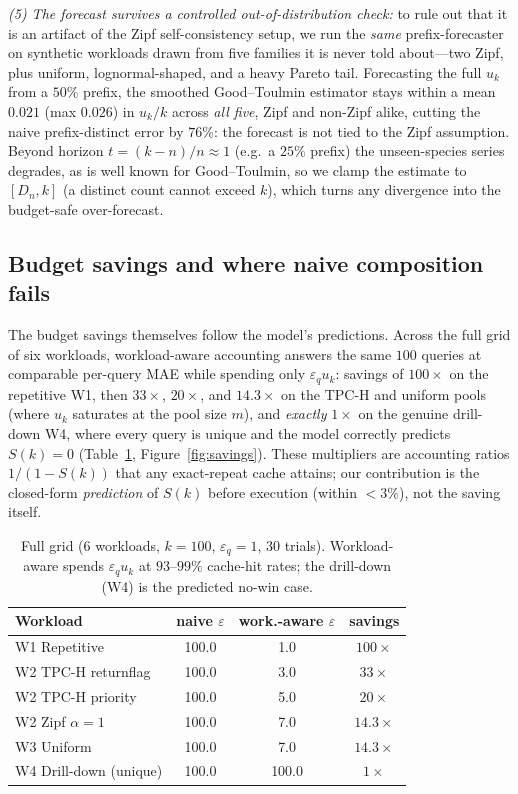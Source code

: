 \documentclass[sigconf,nonacm]{acmart}
\newcommand{\eps}{\varepsilon}
\begin{document}
\emph{(5) The forecast survives a controlled out-of-distribution check:} to rule out that it is an artifact of the Zipf self-consistency setup, we run the \emph{same} prefix-forecaster on synthetic workloads drawn from five families it is never told about---two Zipf, plus uniform, lognormal-shaped, and a heavy Pareto tail. Forecasting the full $u_k$ from a $50\%$ prefix, the smoothed Good--Toulmin estimator stays within a mean $0.021$ (max $0.026$) in $u_k/k$ across \emph{all five}, Zipf and non-Zipf alike, cutting the naive prefix-distinct error by $76\%$: the forecast is not tied to the Zipf assumption. Beyond horizon $t{=}(k{-}n)/n\approx1$ (e.g.\ a $25\%$ prefix) the unseen-species series degrades, as is well known for Good--Toulmin, so we clamp the estimate to $[D_n,k]$ (a distinct count cannot exceed $k$), which turns any divergence into the budget-safe over-forecast.

\subsection{Budget savings and where naive composition fails}

The budget savings themselves follow the model's predictions. Across the full grid of six workloads, workload-aware accounting answers the same $100$ queries at comparable per-query MAE while spending only $\eps_q u_k$: savings of $100\times$ on the repetitive W1, then $33\times$, $20\times$, and $14.3\times$ on the TPC-H and uniform pools (where $u_k$ saturates at the pool size $m$), and \emph{exactly} $1\times$ on the genuine drill-down W4, where every query is unique and the model correctly predicts $S(k){=}0$ (Table~\ref{tab:fullgrid}, Figure~\ref{fig:savings}). These multipliers are accounting ratios $1/(1-S(k))$ that any exact-repeat cache attains; our contribution is the closed-form \emph{prediction} of $S(k)$ before execution (within $<3\%$), not the saving itself.

\begin{table}[h]
\footnotesize\centering
\caption{Full grid (6 workloads, $k{=}100$, $\eps_q{=}1$, 30 trials). Workload-aware spends $\eps_q u_k$ at $93$--$99\%$ cache-hit rates; the drill-down (W4) is the predicted no-win case.}
\label{tab:fullgrid}
\begin{tabular}{l|cc|c}
\toprule
Workload & naive $\eps$ & work.-aware $\eps$ & savings \\
\midrule
W1 Repetitive & 100.0 & 1.0 & $100\times$ \\
W2 TPC-H returnflag & 100.0 & 3.0 & $33\times$ \\
W2 TPC-H priority & 100.0 & 5.0 & $20\times$ \\
W2 Zipf $\alpha{=}1$ & 100.0 & 7.0 & $14.3\times$ \\
W3 Uniform & 100.0 & 7.0 & $14.3\times$ \\
W4 Drill-down (unique) & 100.0 & 100.0 & $1\times$ \\
\bottomrule
\end{tabular}
\end{table}
\end{document}
